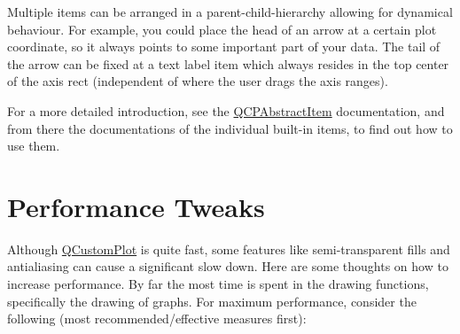 Multiple items can be arranged in a parent-\/child-\/hierarchy allowing for dynamical behaviour. For example, you could place the head of an arrow at a certain plot coordinate, so it always points to some important part of your data. The tail of the arrow can be fixed at a text label item which always resides in the top center of the axis rect (independent of where the user drags the axis ranges).

For a more detailed introduction, see the \hyperlink{classQCPAbstractItem}{Q\-C\-P\-Abstract\-Item} documentation, and from there the documentations of the individual built-\/in items, to find out how to use them.\hypertarget{index_performancetweaks}{}\section{Performance Tweaks}\label{index_performancetweaks}
Although \hyperlink{classQCustomPlot}{Q\-Custom\-Plot} is quite fast, some features like semi-\/transparent fills and antialiasing can cause a significant slow down. Here are some thoughts on how to increase performance. By far the most time is spent in the drawing functions, specifically the drawing of graphs. For maximum performance, consider the following (most recommended/effective measures first)\-:

